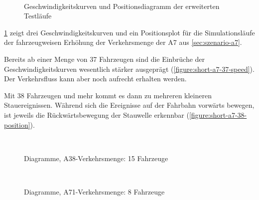 \newpage


\begin{figure}[hptb]
  \centering
   \qquad 
   \qquad 
    \\
  \caption{Geschwindigkeitskurven und Positionsdiagramm der erweiterten Testläufe}
  \label{figure:short-a7}
\end{figure}

\cref{figure:short-a7} zeigt drei Geschwindigkeitskurven und ein Positionsplot für die Simulationsläufe der fahrzeugweisen Erhöhung der Verkehrsmenge der A7 aus \cref{sec:szenario-a7}.

Bereits ab einer Menge von 37 Fahrzeugen sind die Einbrüche der Geschwindigkeitskurven wesentlich stärker ausgeprägt (\cref{figure:short-a7-37-speed}).
Der Verkehrsfluss kann aber noch aufrecht erhalten werden.

Mit 38 Fahrzeugen und mehr kommt es dann zu mehreren kleineren Stauereignissen.
Während sich die Ereignisse auf der Fahrbahn vorwärts bewegen, ist jeweils die Rückwärtsbewegung der Stauwelle erkennbar (\cref{figure:short-a7-38-position}).


\newpage


\begin{figure}[hptb]
  \centering
    \\
  \caption{Diagramme, A38-Verkehrsmenge: 15 Fahrzeuge}
  \label{figure:a38-position-speed}
\end{figure}


\newpage


\begin{figure}[hptb]
  \centering
    \\
  \caption{Diagramme, A71-Verkehrsmenge: 8 Fahrzeuge}
  \label{figure:a71-position-speed}
\end{figure}




